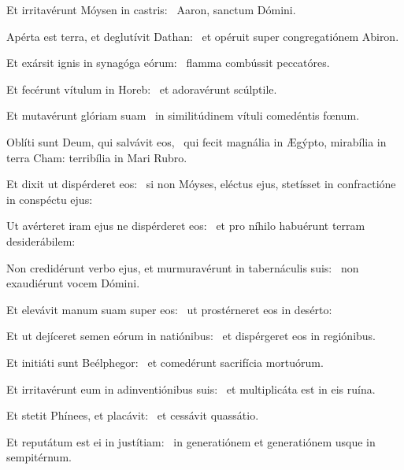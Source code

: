 \item Et irritavérunt Móysen in castris:~\psstar{} Aaron, sanctum Dómini.

\item Apérta est terra, et deglutívit Dathan:~\psstar{} et opéruit super congregatiónem Abiron.

\item Et exársit ignis in synagóga eórum:~\psstar{} flamma combússit peccatóres.

\item Et fecérunt vítulum in Horeb:~\psstar{} et adoravérunt scúlptile.

\item Et mutavérunt glóriam suam~\psstar{} in similitúdinem vítuli comedéntis fœnum.

\item Oblíti sunt Deum, qui salvávit eos,~\psstar{} qui fecit magnália in Ægýpto, mirabília in terra Cham: terribília in Mari Rubro.

\item Et dixit ut dispérderet eos:~\psstar{} si non Móyses, eléctus ejus, stetísset in confractióne in conspéctu ejus:

\item Ut avérteret iram ejus ne dispérderet eos:~\psstar{} et pro níhilo habuérunt terram desiderábilem:

\item Non credidérunt verbo ejus, et murmuravérunt in tabernáculis suis:~\psstar{} non exaudiérunt vocem Dómini.

\item Et elevávit manum suam super eos:~\psstar{} ut prostérneret eos in desérto:

\item Et ut dejíceret semen eórum in natiónibus:~\psstar{} et dispérgeret eos in regiónibus.

\item Et initiáti sunt Beélphegor:~\psstar{} et comedérunt sacrifícia mortuórum.

\item Et irritavérunt eum in adinventiónibus suis:~\psstar{} et multiplicáta est in eis ruína.

\item Et stetit Phínees, et placávit:~\psstar{} et cessávit quassátio.

\item Et reputátum est ei in justítiam:~\psstar{} in generatiónem et generatiónem usque in sempitérnum.


